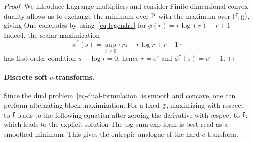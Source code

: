 \begin{proof}
We introduce Lagrange multipliers and consider
	Finite-dimensional convex duality allows us to exchange the minimum over $\P$ with the maximum over $(\fD,\gD)$, giving
	One concludes by using~\eqref{eq-legendre} for $\phi(r)=r \log(r)-r+1$
	Indeed, the scalar maximization
	\[
		\phi^*(s)=\sup_{r\geq0}\{rs-r\log r+r-1\}
	\]
	has first-order condition $s-\log r=0$, hence $r=e^s$ and $\phi^*(s)=e^s-1$.
\end{proof}

\paragraph{Discrete soft $c$-transforms.}

Since the dual problem~\eqref{eq-dual-formulation} is smooth and concave, one can perform alternating block maximization. For a fixed $\gD$, maximizing with respect to $\fD$ leads to the following equation after zeroing the derivative with respect to $\fD$:
which leads to the explicit solution
The log-sum-exp form is best read as a smoothed minimum. This gives the entropic analogue of the hard $c$-transform.

